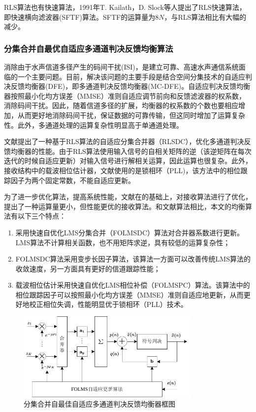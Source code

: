 RLS算法也有快速算法，1991年T. Kailath，D.
Slock\citep{Cioffi1984,Slock1991,Slock1989,Slock1992,Benallal1989}等人提出了RLS快速算法，即快速横向滤波器(SFTF)算法。SFTF的运算量为$8N$，与RLS算法相比有大幅的减少。
\subsubsection*{分集合并自最优自适应多通道判决反馈均衡算法}
消除由于水声信道多径产生的码间干扰(ISI)，是建立可靠、高速水声通信系统面临的一个主要问题。目前，解决该问题的主要手段是结合空间分集技术的自适应判决反馈均衡器(DFE)，即多通道判决反馈均衡器(MC-DFE)\citep{Geller1996,Capellano1998,Geller1995,stojanovic1993,catipovic1996spatial,Ritcey1992,Gooch1988,Monsen1977,Balaban1992,Stojanvoic1993adaptive}。自适应判决反馈均衡器按照最小化均方误差（MMSE）准则自适应调节前向和反馈滤波器的权系数，消除码间干扰。因此，随着信道多径的扩展，均衡器的权系数的个数也要相应增加，从而更好地消除码间干扰，保证数据的可靠传输，但这同时增加了运算复杂性。此外，多通道处理的运算复杂性明显高于单通道处理。

文献提出了一种基于RLS算法的自适应分集合并器（RLSDC），优化多通道判决反馈均衡器的性能。由于RLS算法使用输入信号的自相关矩阵的逆（该逆矩阵在每次迭代的时候自适应更新）对输入信号进行解相关运算，因此运算也很复杂。此外，接收结构中的载波相位估计器，文献使用的是锁相环（PLL)，该方法中的相位跟踪因子为两个固定常数，不能自适应更新。

为了进一步优化算法，提高系统性能，文献在的基础上，对接收算法进行了优化，提出了一种运算量更小，但性能更优的接收算法。和文献算法相比，本文的均衡算法有以下三个特点：
\begin{enumerate}
    \item
       采用快速自优化LMS分集合并（FOLMSDC）算法对合并器系数进行更新。LMS算法不计算相关函数，也不用矩阵求逆，具有较低的运算复杂性；
   \item
       FOLMSDC算法采用变步长因子算法，该算法一方面可以改善传统LMS算法的收敛速度，另一方面具有更好的信道跟踪性能；
   \item  载波相位估计采用快速自优化LMS相位补偿（FOLMSPC）算法。该算法中的相位跟踪因子可以按照最小化均方误差（MMSE）准则自适应地更新，从而更好地校正相位失调，性能明显优于锁相环（PLL）技术。
\end{enumerate}

\begin{figure}[htb]
  \begin{center}
    \includegraphics[width=0.8\textwidth]{images/adaptiveDFE.pdf}
  \end{center}
  \caption{分集合并自最佳自适应多通道判决反馈均衡器框图}
  \label{fig:2.3}
\end{figure}


